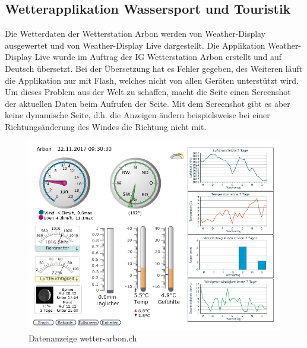 \documentclass[a4paper,ngerman, 11pt, pagesize]{report}
\begin{document}
\subsection{Wetterapplikation Wassersport und Touristik}
Die Wetterdaten der Wetterstation Arbon werden von Weather-Display ausgewertet und von Weather-Display Live dargestellt. Die Applikation Weather-Display Live wurde im Auftrag der IG Wetterstation Arbon erstellt und auf Deutsch übersetzt. Bei der Übersetzung hat es Fehler gegeben, des Weiteren läuft die Applikation nur mit Flash, welches nicht von allen Geräten unterstützt wird. Um dieses Problem aus der Welt zu schaffen, macht die Seite einen Screenshot der aktuellen Daten beim Aufrufen der Seite. Mit dem Screenshot gibt es aber keine dynamische Seite, d.h. die Anzeigen ändern beispielsweise bei einer Richtungsänderung des Windes die Richtung nicht mit.  
\begin{figure}[htbp]
	\centering
	\includegraphics[width=0.9\linewidth]{img/grafik}
	\caption{Datenanzeige wetter-arbon.ch}
	\label{img:grafik-dummy}
\end{figure}
\end{document}
